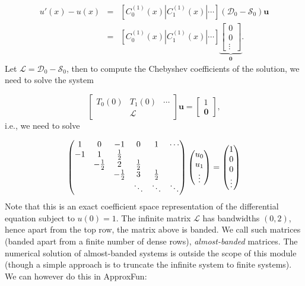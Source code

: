 \documentclass[12pt,landscape]{article}
\begin{document}
{\begin{eqnarray*}
u'(x)-u(x) &=&  \left[ C_0^{(1)}(x) | C_1^{(1)}(x) | \cdots \right]\left(\mathcal{D}_0 - \mathcal{S}_0\right)\mathbf{u}\\
 &=& \left[ C_0^{(1)}(x) | C_1^{(1)}(x) | \cdots \right]\underbrace{\begin{bmatrix} 0 \\ 0 \\ \vdots \end{bmatrix}}_{\mathbf{0}}.
\end{eqnarray*}
Let $\mathcal{L} = \mathcal{D}_0 - \mathcal{S}_0$, then to compute the Chebyshev coefficients of the solution, we need to solve the system

\[
\begin{bmatrix}
T_0(0) & T_1(0) & \cdots  \\
 &\mathcal{L} &
\end{bmatrix}\mathbf{u} = \begin{bmatrix} 1 \\
\mathbf{0}
\end{bmatrix},
\]
i.e., we need to solve

\[
\begin{pmatrix}
      1 & 0 & -1 & 0 & 1 & \cdots \\
    -1 &1 & {1 \over 2} \cr
& -{1 \over 2} & 2 & {1 \over 2} \cr
&& -{1 \over 2} & 3 & {1 \over 2} \cr
&&&\ddots & \ddots & \ddots
\end{pmatrix} \begin{pmatrix} u_0\\u_1\\\vdots \end{pmatrix}  = \begin{pmatrix} 1 \\ 0 \\ 0 \\ \vdots \end{pmatrix}
\]
Note that this is an exact coefficient space representation of the differential equation subject to $u(0) = 1$. The infinite matrix $\mathcal{L}$ has bandwidths $(0,2)$, hence apart from the top row, the matrix above is banded.  We call such matrices (banded apart from a finite number of dense rows), \emph{almost-banded} matrices. The numerical solution of almost-banded systems is outside the scope of this module (though a simple approach is to truncate the infinite system to finite systems). We can however do this in ApproxFun:


}
\end{document}
